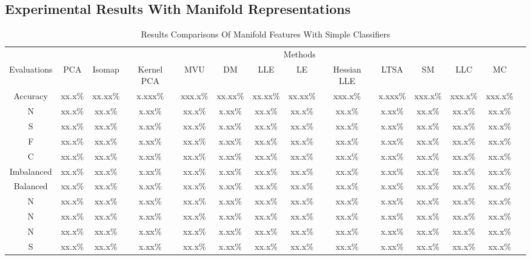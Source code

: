 \documentclass[journal]{IEEEtran}
\begin{document}
\subsection{Experimental Results With Manifold Representations}
\lipsum
\begin{table}[!htbp]
\begin{center}
\begin{threeparttable}
\caption{Results Comparisons Of Manifold Features With Simple Classifiers}
\begin{tabular}{cccccccccccccc}
\hline
\multicolumn{8}{r}{Methods} \\
\cline{2-13}
 Evaluations & PCA &  Isomap      &  Kernel PCA   &   MVU       &  DM  &  LLE  & LE & Hessian LLE  & LTSA  &  SM   &  LLC   & MC\\
\hline
 Accuracy & xx.x\% &  xx.xx\%  &  x.xxx\%   & xxx.x\%    &  xx.xx\%  & xx.xx\%& xx.xx\% &xxx.x\%&  x.xxx\%& xxx.x\%&xxx.x\%&xxx.x\% \\
 N & xx.x\% &  xx.x\%  &  x.xx\%   & xx.x\%    &  x.xx\%  & xx.x\%& xx.x\% &xx.x\%&  x.xx\%& xx.x\%&xx.x\%&xx.x\% \\
 S & xx.x\% &  xx.x\%  &  x.xx\%   & xx.x\%    &  x.xx\%  & xx.x\%& xx.x\% &xx.x\%&  x.xx\%& xx.x\%&xx.x\%&xx.x\% \\
 F & xx.x\% &  xx.x\%  &  x.xx\%   & xx.x\%    &  x.xx\%  & xx.x\%& xx.x\% &xx.x\%&  x.xx\%& xx.x\%&xx.x\%&xx.x\% \\
 C & xx.x\% &  xx.x\%  &  x.xx\%   & xx.x\%    &  x.xx\%  & xx.x\%& xx.x\% &xx.x\%&  x.xx\%& xx.x\%&xx.x\%&xx.x\% \\
 Imbalanced & xx.x\% &  xx.x\%  &  x.xx\%   & xx.x\%    &  x.xx\%  & xx.x\%& xx.x\% &xx.x\%&  x.xx\%& xx.x\%&xx.x\%&xx.x\% \\
  Balanced & xx.x\% &  xx.x\%  &  x.xx\%   & xx.x\%    &  x.xx\%  & xx.x\%& xx.x\% &xx.x\%&  x.xx\%& xx.x\%&xx.x\%&xx.x\% \\
        N & xx.x\% &  xx.x\%  &  x.xx\%   & xx.x\%    &  x.xx\%  & xx.x\%& xx.x\% &xx.x\%&  x.xx\%& xx.x\%&xx.x\%&xx.x\% \\
         N & xx.x\% &  xx.x\%  &  x.xx\%   & xx.x\%    &  x.xx\%  & xx.x\%& xx.x\% &xx.x\%&  x.xx\%& xx.x\%&xx.x\%&xx.x\% \\
          N & xx.x\% &  xx.x\%  &  x.xx\%   & xx.x\%    &  x.xx\%  & xx.x\%& xx.x\% &xx.x\%&  x.xx\%& xx.x\%&xx.x\%&xx.x\% \\
          S & xx.x\% &  xx.x\%  &  x.xx\%   & xx.x\%    &  x.xx\%  & xx.x\%& xx.x\% &xx.x\%&  x.xx\%& xx.x\%&xx.x\%&xx.x\% \\

\end{tabular}
\end{threeparttable}
\end{center}
\end{table}
\end{document}
